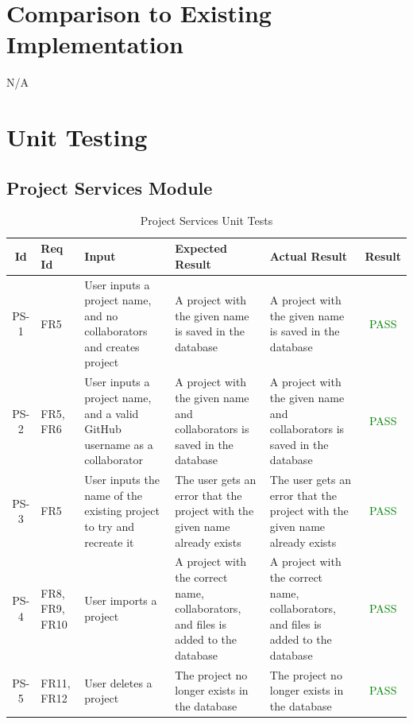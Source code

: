 \documentclass[12pt, titlepage]{article}
\begin{document}
\section{Comparison to Existing Implementation}	

N/A

\section{Unit Testing}

\subsection{Project Services Module}

\begin{center}
    \begin{longtable}{|c|p{1cm}|p{2.7cm}|p{3cm}|p{3cm}|c|}
        \caption{Project Services Unit Tests \label{long}}\\
        \hline
        \textbf{Id} & \textbf{Req Id} & \textbf{Input} & \textbf{Expected Result} & \textbf{Actual Result} & \textbf{Result}   \\
        \hline
        PS-1 & FR5  & User inputs a project name, and no collaborators and creates project & A project with the given name is saved in the database  &  A project with the given name is saved in the database &  \textcolor{green}{PASS} \\
        \hline
        PS-2 & FR5, FR6  & User inputs a project name, and a valid GitHub username as a collaborator & A project with the given name and collaborators is saved in the database & A project with the given name and collaborators is saved in the database &  \textcolor{green}{PASS} \\
        \hline
        PS-3 & FR5 & User inputs the name of the existing project to try and recreate it & The user gets an error that the project with the given name already exists & The user gets an error that the project with the given name already exists &  \textcolor{green}{PASS} \\
        \hline
        PS-4 & FR8, FR9, FR10  & User imports a project & A project with the correct name, collaborators, and files is added to the database & A project with the correct name, collaborators, and files is added to the database &  \textcolor{green}{PASS} \\
        \hline
        PS-5 & FR11, FR12  & User deletes a project & The project no longer exists in the database & The project no longer exists in the database &  \textcolor{green}{PASS} \\

\end{longtable}
\end{center}
\end{document}
